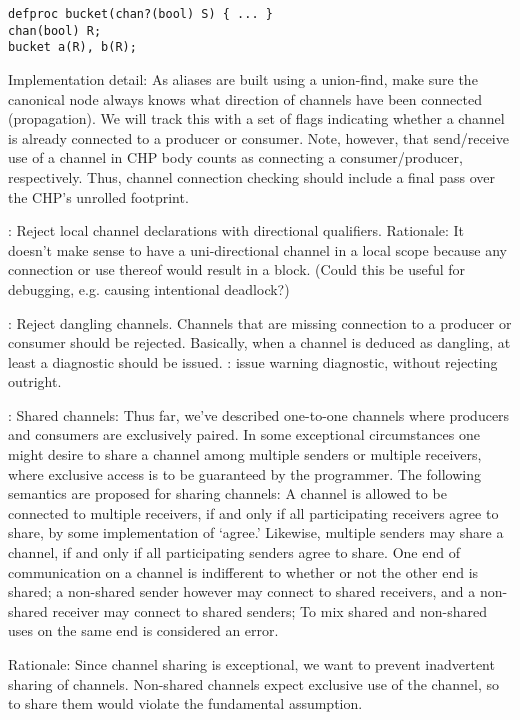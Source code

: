 \begin{verbatim}
defproc bucket(chan?(bool) S) { ... }
chan(bool) R;
bucket a(R), b(R);
\end{verbatim}

Implementation detail: 
As aliases are built using a union-find, make sure the canonical node
always knows what direction of channels have been connected (propagation).  
We will track this with a set of flags indicating whether a channel
is already connected to a producer or consumer.  
Note, however, that send/receive use of a channel in CHP body counts as 
connecting a consumer/producer, respectively.  
Thus, channel connection checking should include a final pass over
the CHP's unrolled footprint.  

: 
Reject local channel declarations with directional qualifiers.  
Rationale: It doesn't make sense to have a uni-directional channel
in a local scope because any connection or use thereof would result
in a block.  
(Could this be useful for debugging, e.g. causing intentional deadlock?)

: Reject dangling channels.  
Channels that are missing connection to a producer or consumer
should be rejected.  Basically, when a channel is deduced as dangling, 
at least a diagnostic should be issued.  
: issue warning diagnostic, without rejecting outright.

: Shared channels:
Thus far, we've described one-to-one channels where producers
and consumers are exclusively paired.  
In some exceptional circumstances one might desire to share a 
channel among multiple senders or multiple receivers, 
where exclusive access is to be guaranteed by the programmer.  
The following semantics are proposed for sharing channels:
A channel is allowed to be connected to multiple receivers, if and only if
all participating receivers agree to share, 
by some implementation of `agree.'
Likewise, multiple senders may share a channel, if and only if
all participating senders agree to share.  
One end of communication on a channel is indifferent
to whether or not the other end is shared; 
a non-shared sender however may connect to shared receivers, 
and a non-shared receiver may connect to shared senders;
To mix shared and non-shared uses on the same end is considered
an error.  

Rationale: Since channel sharing is exceptional, we want to prevent
inadvertent sharing of channels.  Non-shared channels expect 
exclusive use of the channel, so to share them would violate
the fundamental assumption.  

